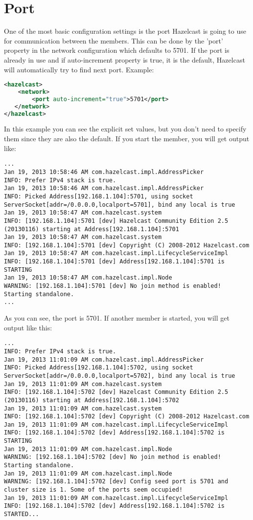 \section{Port}
One of the most basic configuration settings is the port Hazelcast is going to use for communication between the members. This can be done by the 'port' property in the network configuration which defaults to 5701. If the port is already in use and if auto-increment property is true, it is the default, Hazelcast will automatically try to find next port. Example:
\begin{lstlisting}[language=xml]
<hazelcast>
    <network>
        <port auto-increment="true">5701</port>
   </network>
</hazelcast>
\end{lstlisting}
In this example you can see the explicit set values, but you don't need to specify them since they are also the default. If you start the member, you will get output like:
\begin{lstlisting}
...
Jan 19, 2013 10:58:46 AM com.hazelcast.impl.AddressPicker
INFO: Prefer IPv4 stack is true.
Jan 19, 2013 10:58:46 AM com.hazelcast.impl.AddressPicker
INFO: Picked Address[192.168.1.104]:5701, using socket ServerSocket[addr=/0.0.0.0,localport=5701], bind any local is true
Jan 19, 2013 10:58:47 AM com.hazelcast.system
INFO: [192.168.1.104]:5701 [dev] Hazelcast Community Edition 2.5 (20130116) starting at Address[192.168.1.104]:5701
Jan 19, 2013 10:58:47 AM com.hazelcast.system
INFO: [192.168.1.104]:5701 [dev] Copyright (C) 2008-2012 Hazelcast.com
Jan 19, 2013 10:58:47 AM com.hazelcast.impl.LifecycleServiceImpl
INFO: [192.168.1.104]:5701 [dev] Address[192.168.1.104]:5701 is STARTING
Jan 19, 2013 10:58:47 AM com.hazelcast.impl.Node
WARNING: [192.168.1.104]:5701 [dev] No join method is enabled! Starting standalone.
...
\end{lstlisting}
As you can see, the port is 5701. If another member is started, you will get output like this:
\begin{lstlisting}
...
INFO: Prefer IPv4 stack is true.
Jan 19, 2013 11:01:09 AM com.hazelcast.impl.AddressPicker
INFO: Picked Address[192.168.1.104]:5702, using socket ServerSocket[addr=/0.0.0.0,localport=5702], bind any local is true
Jan 19, 2013 11:01:09 AM com.hazelcast.system
INFO: [192.168.1.104]:5702 [dev] Hazelcast Community Edition 2.5 (20130116) starting at Address[192.168.1.104]:5702
Jan 19, 2013 11:01:09 AM com.hazelcast.system
INFO: [192.168.1.104]:5702 [dev] Copyright (C) 2008-2012 Hazelcast.com
Jan 19, 2013 11:01:09 AM com.hazelcast.impl.LifecycleServiceImpl
INFO: [192.168.1.104]:5702 [dev] Address[192.168.1.104]:5702 is STARTING
Jan 19, 2013 11:01:09 AM com.hazelcast.impl.Node
WARNING: [192.168.1.104]:5702 [dev] No join method is enabled! Starting standalone.
Jan 19, 2013 11:01:09 AM com.hazelcast.impl.Node
WARNING: [192.168.1.104]:5702 [dev] Config seed port is 5701 and cluster size is 1. Some of the ports seem occupied!
Jan 19, 2013 11:01:09 AM com.hazelcast.impl.LifecycleServiceImpl
INFO: [192.168.1.104]:5702 [dev] Address[192.168.1.104]:5702 is STARTED...
\end{lstlisting}
